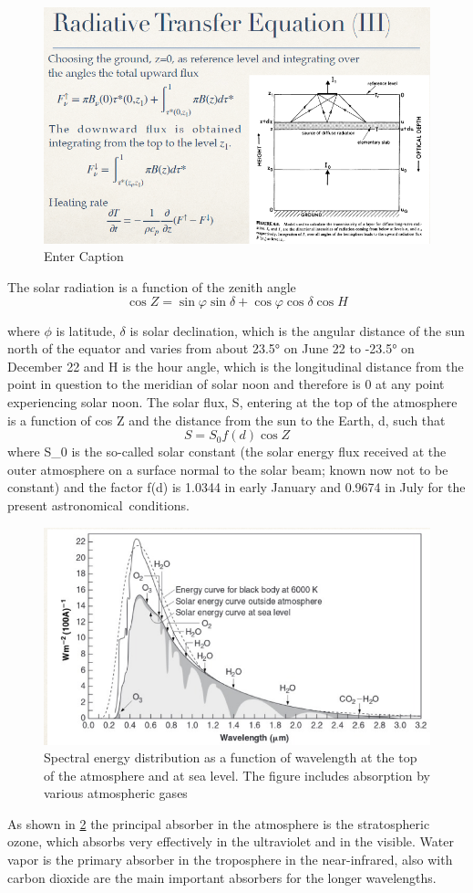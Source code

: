 \begin{figure}[h!]
	\centering
	\includegraphics[width=0.5\linewidth]{uploads/18image.png}
	\caption{Enter Caption}
	\label{fig:enter-label}
\end{figure}

The solar radiation is a function of the zenith angle
$$\cos Z = \sin \varphi \sin \delta + \cos \varphi \cos \delta \cos H$$

where $\phi$ is latitude, $\delta$ is solar declination, which is the angular distance of the sun north of the equator and varies from about 23.5° on June 22 to -23.5° on December 22 and H is the hour angle, which is the longitudinal distance from the point in question to the meridian of solar noon and therefore is 0 at any point experiencing solar noon.
The solar flux, S, entering at the top of the atmosphere is a function of cos Z and the distance from the sun to the Earth, d, such that
$$S = S_0 f(d) \cos Z$$
where S_{0} is the so-called solar constant (the solar energy flux received at the outer atmosphere on a surface normal to the solar beam; known now not to be constant) and the factor f(d) is 1.0344 in early January and 0.9674 in July for the present astronomical conditions.
\begin{figure}[h!]
	\centering
	\includegraphics[width=0.5\linewidth]{uploads/image12.png}
	\caption{Spectral energy distribution as a function of wavelength at the top of the atmosphere and at sea level. The figure includes absorption by various atmospheric gases}
	\label{fig1}

\end{figure}
As shown in \ref{fig1} the principal absorber in the atmosphere is the stratospheric ozone, which absorbs very effectively in the ultraviolet and in the visible. Water vapor is the primary absorber in the troposphere in the near-infrared, also with carbon dioxide are the main important absorbers for the longer wavelengths.

